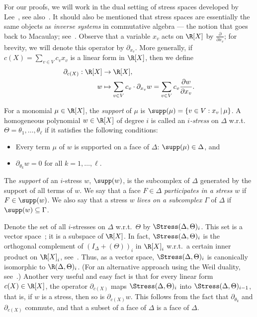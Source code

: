For our proofs, we will work in the dual setting of stress spaces developed by Lee~\cite{Lee96}, see also~\cite[Section 3]{Adiprasito-g-conj}. It should also be mentioned that stress spaces are essentially the same objects as \emph{inverse systems} in commutative algebra --- the notion that goes back to Macaulay; see~\cite[Theorem 21.6 and Exercise 21.7]{Eisenbud}. Observe that a variable $x_v$ acts on $\R[X]$ by $\frac{\partial}{\partial{x_v}}$; for brevity, we will denote this operator by $\partial_{x_v}$. More generally, if $c(X)=\sum_{v\in V} c_v x_v$ is a linear form in $\R[X]$, then we define \begin{equation*}
\begin{split}
\partial_{c(X)} : \R[X]&\to\R[X], \\
w&\mapsto \sum_{v\in V}c_v\cdot\partial_{x_v}w=\sum_{v\in V}c_v\frac{\partial w}{\partial{x_v}}.
\end{split}
\end{equation*}
	
For a monomial $\mu\in \R[X]$, the \emph{support} of $\mu$ is $\supp(\mu)=\{v\in V : x_v\,|\,\mu\}$. A homogeneous polynomial $w\in\R[X]$ of degree $i$ is called an \emph{$i$-stress} on $\Delta$ w.r.t.~$\Theta=\theta_1,\ldots,\theta_\ell$ if it satisfies the following conditions:
	\begin{itemize}
	\item Every term $\mu$ of $w$ is supported on a face of $\Delta$: $\supp(\mu)\in\Delta$, and
	\item $\partial_{\theta_k}w=0$ for all $k=1,\ldots,\ell$.
	\end{itemize}
The \emph{support} of an $i$-stress $w$, $\supp (w)$, is the subcomplex of $\Delta$ generated by the support of all terms of $w$. We say that a face $F\in\Delta$ \emph{participates in a stress $w$} if $F\in \supp(w)$. We also say that a stress $w$ \emph{lives on a subcomplex $\Gamma$} of $\Delta$ if $\supp(w)\subseteq \Gamma$.

Denote the set of all $i$-stresses on $\Delta$ w.r.t.~$\Theta$ by $\Stress(\Delta, \Theta)_i$. 
This set is a vector space~\cite{Adiprasito-g-conj,Lee96}; it is a subspace of $\R[X]$. In fact, $\Stress(\Delta, \Theta)_i$ is the orthogonal complement of $(I_\Delta+(\Theta))_i$ in $\R[X]_i$ w.r.t.~a certain inner product on $\R[X]_i$, see~\cite[Section 3]{Lee96}. Thus, as a vector space, $\Stress(\Delta, \Theta)_i$ is canonically isomorphic to $\R(\Delta, \Theta)_i$. (For an alternative approach using the Weil duality, see~\cite[Section 3]{Adiprasito-g-conj}.) Another very useful and easy fact is that for every linear form $c(X)\in \R[X]$, the operator $\partial_{c(X)}$ maps $\Stress(\Delta,\Theta)_i$ into $\Stress(\Delta, \Theta)_{i-1}$, that is, if $w$ is a stress, then so is $\partial_{c(X)}w$. This follows from the fact that $\partial_{\theta_k}$ and $\partial_{c(X)}$ commute, and that a subset of a face of $\Delta$ is a face of $\Delta$.

